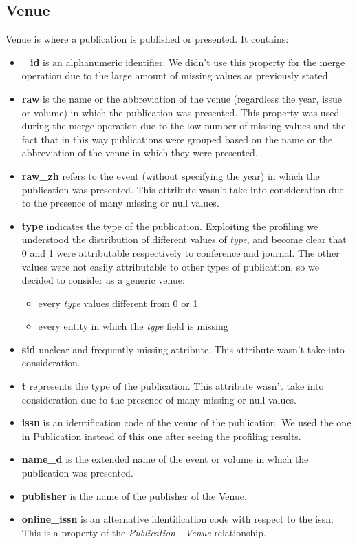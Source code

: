 \documentclass{Configuration_Files/PoliMi3i_thesis}
\begin{document}
\subsection{Venue}
Venue is where a publication is published or presented. It contains:
\begin{itemize}
    \item \textbf{\_id} is an alphanumeric identifier. We didn't use this property for the merge operation due to the large
            amount of missing values as previously stated.
    \item \textbf{raw} is the name or the abbreviation of the venue (regardless the year, issue or volume) in which the
            publication was presented. This property was used during the merge operation due to the low number of missing
            values and the fact that in this way publications were grouped based on the name or the abbreviation of the venue in which they were presented.
    \item \textbf{raw\_zh} refers to the event (without specifying the year) in which the publication was presented. 
            This attribute wasn't take into consideration due to the presence of many missing or null values.
    \item \textbf{type} indicates the type of the publication. Exploiting the profiling we understood the distribution
            of different values of \emph{type}, and become clear that 0 and 1 were attributable respectively to conference
            and journal. The other values were not easily attributable to other types of publication, so we decided to consider
            as a generic venue:
            \begin{itemize}
                \item every \emph{type} values different from 0 or 1
                \item every entity in which the \emph{type} field is missing
            \end{itemize} 
    \item \textbf{sid} unclear and frequently missing attribute. This attribute wasn't take into consideration.
    \item \textbf{t} represents the type of the publication. This attribute wasn't take into consideration due to the
            presence of many missing or null values.
    \item \textbf{issn} is an identification code of the venue of the publication. We used the one in Publication instead of
        this one after seeing the profiling results.
    \item \textbf{name\_d} is the extended name of the event or volume in which the publication was presented.
    \item \textbf{publisher} is the name of the publisher of the Venue.
    \item \textbf{online\_issn} is an alternative identification code with respect to the issn. This is a property of the \emph{Publication}
        - \emph{Venue} relationship.
\end{itemize}
\end{document}
